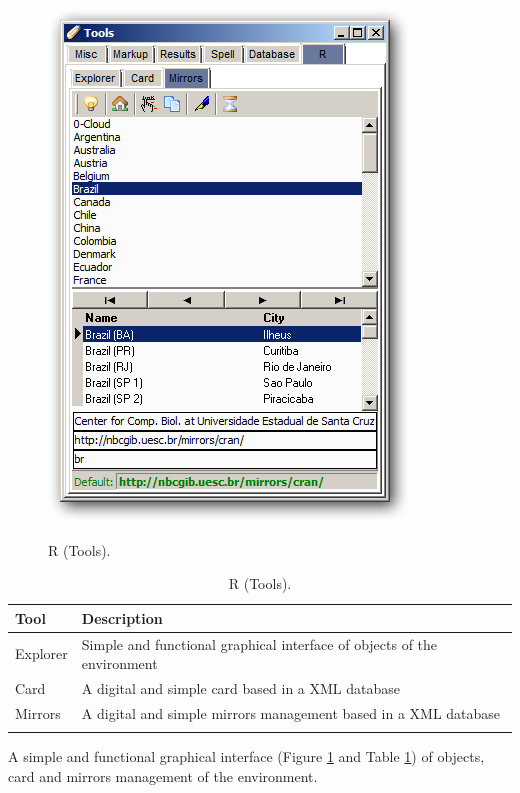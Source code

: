 \begin{figure}[h!]
  \includegraphics[scale=0.35]{./res/tools_r_mirrors.png}\\
  \caption{R (Tools).}
  \label{fig:tools_r}
\end{figure}

\begin{table}
  \begin{footnotesize}
    \begin{tabularx}{\textwidth}{>{\hsize=0.3\hsize}X>{\hsize=0.7\hsize}X}\\
      \hline
      \textbf{Tool} & \textbf{Description} \\
      \hline
      Explorer & Simple and functional graphical interface of objects of the \RR{} environment \\
      Card & A digital and simple \RR{} card based in a XML database \\
      Mirrors & A digital and simple \RR{} mirrors management based in a XML database \\
      \hline
      \\
    \end{tabularx}
  \end{footnotesize}
  \caption{R (Tools).}
  \label{tab:tools_r}
\end{table}

A simple and functional graphical interface
(Figure \ref{fig:tools_r} and
Table \ref{tab:tools_r})
of objects, card and mirrors management of the \RR{} environment.


